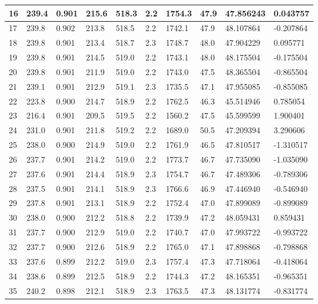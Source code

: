 \begin{longtable}[c]{|l|l|l|l|l|l|l|l|l|l|}
16 & 239.4 & 0.901 & 215.6 & 518.3 & 2.2  & 1754.3  & 47.9 & 47.856243 & 0.043757  \\ \hline
17 & 239.8 & 0.902 & 213.8 & 518.5 & 2.2  & 1742.1  & 47.9 & 48.107864 & -0.207864 \\ \hline
18 & 239.8 & 0.901 & 213.4 & 518.7 & 2.3  & 1748.7  & 48.0 & 47.904229 & 0.095771  \\ \hline
19 & 239.8 & 0.901 & 214.5 & 519.0 & 2.2  & 1743.1  & 48.0 & 48.175504 & -0.175504 \\ \hline
20 & 239.8 & 0.901 & 211.9 & 519.0 & 2.2  & 1743.0  & 47.5 & 48.365504 & -0.865504 \\ \hline
21 & 239.1 & 0.901 & 212.9 & 519.1 & 2.3  & 1735.5  & 47.1 & 47.955085 & -0.855085 \\ \hline
22 & 223.8 & 0.900 & 214.7 & 518.9 & 2.2  & 1762.5  & 46.3 & 45.514946 & 0.785054  \\ \hline
23 & 216.4 & 0.901 & 209.5 & 519.5 & 2.2  & 1560.2  & 47.5 & 45.599599 & 1.900401  \\ \hline
24 & 231.0 & 0.901 & 211.8 & 519.2 & 2.2  & 1689.0  & 50.5 & 47.209394 & 3.290606  \\ \hline
25 & 238.0 & 0.900 & 214.9 & 519.0 & 2.2  & 1761.9  & 46.5 & 47.810517 & -1.310517 \\ \hline
26 & 237.7 & 0.901 & 214.2 & 519.0 & 2.2  & 1773.7  & 46.7 & 47.735090 & -1.035090 \\ \hline
27 & 237.6 & 0.901 & 214.4 & 518.9 & 2.3  & 1754.7  & 46.7 & 47.489306 & -0.789306 \\ \hline
28 & 237.5 & 0.901 & 214.1 & 518.9 & 2.3  & 1766.6  & 46.9 & 47.446940 & -0.546940 \\ \hline
29 & 237.8 & 0.901 & 213.1 & 518.9 & 2.2  & 1752.4  & 47.0 & 47.899089 & -0.899089 \\ \hline
30 & 238.0 & 0.900 & 212.2 & 518.8 & 2.2  & 1739.9  & 47.2 & 48.059431 & 0.859431  \\ \hline
31 & 237.7 & 0.900 & 212.9 & 519.0 & 2.2  & 1740.7  & 47.0 & 47.993722 & -0.993722 \\ \hline
32 & 237.7 & 0.900 & 212.6 & 518.9 & 2.2  & 1765.0  & 47.1 & 47.898868 & -0.798868 \\ \hline
33 & 237.6 & 0.899 & 212.2 & 519.0 & 2.3  & 1757.4  & 47.3 & 47.718064 & -0.418064 \\ \hline
34 & 238.6 & 0.899 & 212.5 & 518.9 & 2.2  & 1744.3  & 47.2 & 48.165351 & -0.965351 \\ \hline
35 & 240.2 & 0.898 & 212.1 & 518.9 & 2.3  & 1763.5  & 47.3 & 48.131774 & -0.831774 \\ \hline

\end{longtable}
